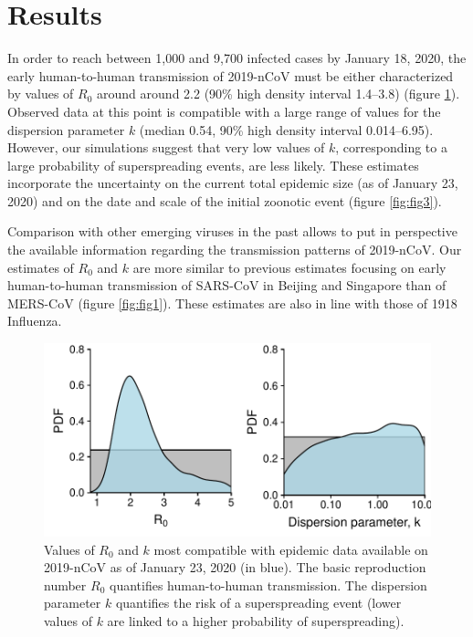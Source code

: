 \documentclass{article}
\begin{document}
\section*{Results}
In order to reach between 1,000 and 9,700 infected cases by January 18, 2020, the early human-to-human transmission of 2019-nCoV must be either characterized by values of $R_0$ around around 2.2 (90\% high density interval 1.4--3.8) (figure \ref{fig:fig2}).
Observed data at this point is compatible with a large range of values for the dispersion parameter $k$ (median 0.54, 90\% high density interval 0.014--6.95).
However, our simulations suggest that very low values of $k$, corresponding to a large probability of superspreading events, are less likely.
These estimates incorporate the uncertainty on the current total epidemic size (as of January 23, 2020) and on the date and scale of the initial zoonotic event (figure \ref{fig:fig3}).

Comparison with other emerging viruses in the past allows to put in perspective the available information regarding the transmission patterns of 2019-nCoV.
Our estimates of $R_0$ and $k$ are more similar to previous estimates focusing on early human-to-human transmission of SARS-CoV in Beijing and Singapore\cite{Lloyd-Smith:2005} than of MERS-CoV\cite{Kucharski:2015b} (figure \ref{fig:fig1}).
These estimates are also in line with those of 1918 Influenza.\cite{Fraser:2011}



\begin{figure}[h]
	\centering
	\includegraphics[width=.6\linewidth]{../figure/fig2.pdf}
	\caption{Values of $R_0$ and $k$ most compatible with epidemic data available on 2019-nCoV as of January 23, 2020 (in blue). The basic reproduction number $R_0$ quantifies human-to-human transmission. The dispersion parameter $k$ quantifies the risk of a superspreading event (lower values of $k$ are linked to a higher probability of superspreading).}
	\label{fig:fig2}
\end{figure}
\end{document}
